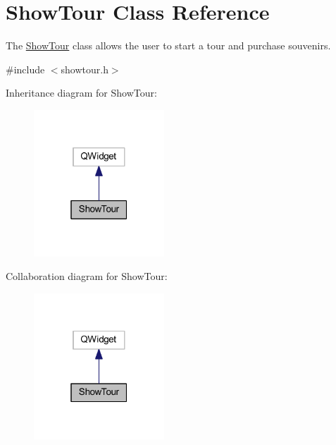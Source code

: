 \hypertarget{class_show_tour}{}\section{Show\+Tour Class Reference}
\label{class_show_tour}


The \hyperlink{class_show_tour}{Show\+Tour} class allows the user to start a tour and purchase souvenirs.  




{\ttfamily \#include $<$showtour.\+h$>$}



Inheritance diagram for Show\+Tour\+:
\nopagebreak
\begin{figure}[H]
\begin{center}
\leavevmode
\includegraphics[width=139pt]{class_show_tour__inherit__graph}
\end{center}
\end{figure}


Collaboration diagram for Show\+Tour\+:
\nopagebreak
\begin{figure}[H]
\begin{center}
\leavevmode
\includegraphics[width=139pt]{class_show_tour__coll__graph}
\end{center}
\end{figure}
